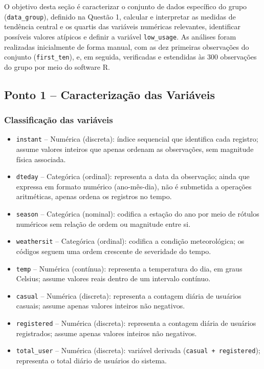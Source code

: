 \documentclass[10pt, a4paper]{article}
\begin{document}
O objetivo desta seção é caracterizar o conjunto de dados específico do grupo (\texttt{data\_group}), definido na Questão 1, calcular e interpretar as medidas de tendência central e os quartis das variáveis numéricas relevantes, identificar possíveis valores atípicos e definir a variável \texttt{low\_usage}. As análises foram realizadas inicialmente de forma manual, com as dez primeiras observações do conjunto (\texttt{first\_ten}), e, em seguida, verificadas e estendidas às 300 observações do grupo por meio do software R.

\subsection{Ponto 1 -- Caracterização das Variáveis}

\subsubsection{Classificação das variáveis}

\begin{itemize}
    \item \texttt{instant} -- Numérica (discreta): índice sequencial que identifica cada registro; assume valores inteiros que apenas ordenam as observações, sem magnitude física associada.
    \item \texttt{dteday} -- Categórica (ordinal): representa a data da observação; ainda que expressa em formato numérico (ano-mês-dia), não é submetida a operações aritméticas, apenas ordena os registros no tempo.
    \item \texttt{season} -- Categórica (nominal): codifica a estação do ano por meio de rótulos numéricos sem relação de ordem ou magnitude entre si.
    \item \texttt{weathersit} -- Categórica (ordinal): codifica a condição meteorológica; os códigos seguem uma ordem crescente de severidade do tempo.
    \item \texttt{temp} -- Numérica (contínua): representa a temperatura do dia, em graus Celsius; assume valores reais dentro de um intervalo contínuo.
    \item \texttt{casual} -- Numérica (discreta): representa a contagem diária de usuários casuais; assume apenas valores inteiros não negativos.
    \item \texttt{registered} -- Numérica (discreta): representa a contagem diária de usuários registrados; assume apenas valores inteiros não negativos.
    \item \texttt{total\_user} -- Numérica (discreta): variável derivada (\texttt{casual + registered}); representa o total diário de usuários do sistema.
\end{itemize}
\end{document}

